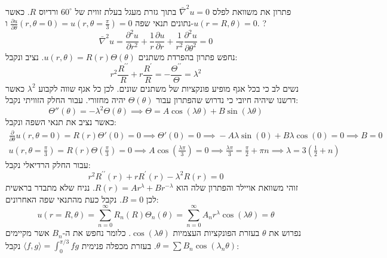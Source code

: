 \documentclass{tstextbook}
\begin{document}
פתרון את משוואת לפלס \(\bar{\nabla}^2u=0\) בתוך גזרת מעגל בעלת זווית של \(60^\circ\) ורדיוס \(R\). כאשר נתונים תנאי שפה \(\frac{\partial u}{\partial \theta}\left( r,\theta=0 \right)=u\left( r,\theta=\frac{\pi}{3} \right)=0\) ו-\(u\left( r=R,\theta \right)=0\).
?
$$\bar{\nabla}^2 u={\frac{\partial^{2}u}{\partial r^{2}}}+{\frac{1}{r}}{\frac{\partial u}{\partial r}}+{\frac{1}{r^{2}}}{\frac{\partial^{2}u}{\partial\theta^{2}}}=0$$
נחפש פתרון בהפרדת משתנים \(u\left( r,\theta \right)=R(r)\Theta\left( \theta \right)\). נציב ונקבל:
$$r^{2}\frac{R^{\prime\prime}}{R}+r\frac{R^{\prime}}{R}=-\frac{\Theta^{\prime\prime}}{\Theta}=\lambda^2$$
נשים לב כי בכל אגף מופיע פונקציות של משתנים שונים. לכן כל אגף שווה לקבוע \(\lambda^2\) כאשר דרשנו שיהיה חיובי כי נדרוש שהפתרון עבור \(\Theta\left( \theta \right)\) יהיה מחזורי. עבור החלק הזוויתי נקבל:
$$\Theta''\left( \theta \right)=-\lambda^2\Theta\left( \theta \right)\implies \Theta=A\cos\left( \lambda\theta \right)+B\sin\left( \lambda \theta \right)$$
כאשר נציב את תנאי השפה ונקבל:
\begin{gather*} \frac{\partial }{\partial \theta} u\left( r,\theta=0 \right)\!=\!R(r)\Theta'(0)\!=\!0\!\!\implies \!\!\Theta'(0)\!=\!0\!\implies\!\! -A\lambda\sin\left( 0 \right)+B\lambda \cos\left( 0 \right)\!=\!0\!\!\implies\!\! B=0  \\ u\left( r,\theta\!=\!\frac{\pi}{3} \right)\!=\!R(r)\Theta\left( \frac{\pi}{3} \right)\!=\!0\!\!\implies\!\! A\cos\left( \frac{\lambda \pi}{3} \right)\!=\!0\!\!\implies\!\! \frac{\lambda \pi}{3}\!=\!\frac{\pi}{2}+\pi n\!\!\implies\!\! \lambda\!=\!3\left( \frac{1}{2}+n \right)
\end{gather*}
עבור החלק הרדיאלי נקבל:
$$r^{2}R^{\prime\prime}\left(r\right)+r R^{\prime}\left(r\right)-\lambda^{2}R\left(r\right)=0$$
זוהי משוואת אויילר והפתרון שלה הוא \(R(r)=Ar^\lambda+Br^{-\lambda}\). נניח שלא מתבדר בראשית לכן \(B=0\). נקבל כעת מהתנאי שפה האחרונים:
$$u\left( r=R,\theta \right)=\sum_{n=0}^\infty R_{n}(R)\Theta_{n}\left( \theta \right)=\sum_{n=0}^{\infty} A_{n}r^{\lambda}\cos\left( \lambda \theta \right)=\theta$$
נפרוש את \(\theta\) בעזרת הפונקציות העצמיות \(\cos\left( \lambda \theta \right)\). כלומר נחפש את ה-\(B_{n}\) אשר מקיימים \(\theta=\sum B_{n}\cos\left( \lambda_{n}\theta \right)\). בעזרת מכפלה פנימית \(\langle f, g \rangle=\int_{0}^{\pi/3}fg\) נקבל:
\end{document}
